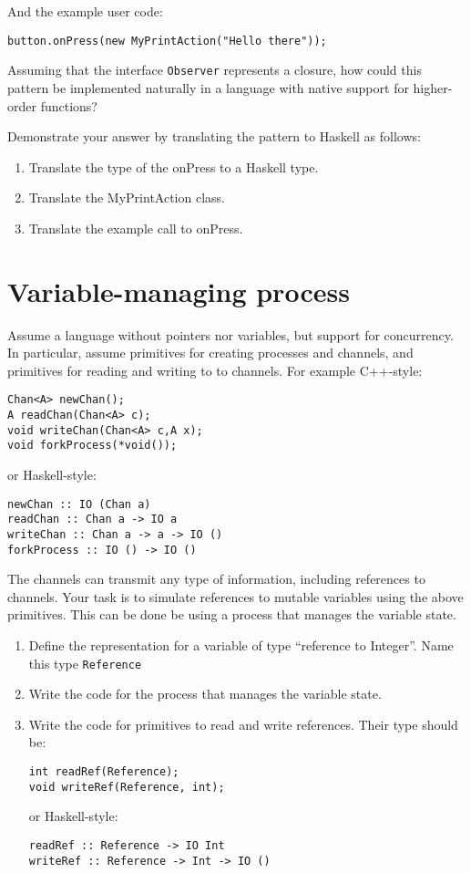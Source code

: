 \documentclass{article}
\begin{document}
And the example user code:

\begin{verbatim}
button.onPress(new MyPrintAction("Hello there"));
\end{verbatim}

Assuming that the interface \texttt{Observer} represents a closure, how
could this pattern be implemented naturally in a language with native
support for higher-order functions?

Demonstrate your answer by translating the pattern to Haskell as
follows:
\begin{enumerate}
\item Translate the type of the onPress to a Haskell type.
\item Translate the MyPrintAction class.
\item Translate the example call to onPress.
\end{enumerate}

\section{Variable-managing process}

Assume a language without pointers nor variables, but support for
concurrency. In particular, assume primitives for creating processes
and channels, and primitives for reading and writing to to
channels. For example C++-style:

\begin{verbatim}
Chan<A> newChan();
A readChan(Chan<A> c);
void writeChan(Chan<A> c,A x);
void forkProcess(*void());
\end{verbatim}
or Haskell-style:
\begin{verbatim}
newChan :: IO (Chan a)
readChan :: Chan a -> IO a
writeChan :: Chan a -> a -> IO ()
forkProcess :: IO () -> IO ()
\end{verbatim}

The channels can transmit any type of information, including
references to channels. Your task is to simulate references to mutable
variables using the above primitives. This can be done be using a
process that manages the variable state.

\begin{enumerate}
\item Define the representation for a variable of type ``reference to
  Integer''. Name this type \texttt{Reference}
\item Write the code for the process that manages the variable state.
\item Write the code for primitives to read and write references.
Their type should be:
\begin{verbatim}
int readRef(Reference);
void writeRef(Reference, int);
\end{verbatim}
or Haskell-style:
\begin{verbatim}
readRef :: Reference -> IO Int
writeRef :: Reference -> Int -> IO ()
\end{verbatim}
\end{enumerate}
\end{document}
